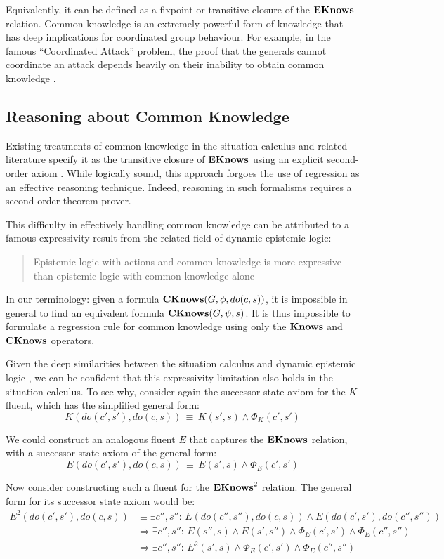 Equivalently, it can be defined as a fixpoint or transitive closure
of the $\mathbf{EKnows}$ relation. Common knowledge is an extremely powerful
form of knowledge that has deep implications for coordinated group
behaviour. For example, in the famous {}``Coordinated Attack'' problem,
the proof that the generals cannot coordinate an attack depends heavily
on their inability to obtain common knowledge \citep{halpern90knowledge_distrib}.


\subsection{Reasoning about Common Knowledge}

Existing treatments of common knowledge in the situation calculus
and related literature specify it as the transitive closure of $\mathbf{EKnows}$
using an explicit second-order axiom \citep{davis05fo_ma_theory,ghaderi07sc_joint_ability}.
While logically sound, this approach forgoes the use of regression
as an effective reasoning technique. Indeed, reasoning in such formalisms
requires a second-order theorem prover.

This difficulty in effectively handling common knowledge can be attributed
to a famous expressivity result from the related field of dynamic
epistemic logic:

\begin{quote}
Epistemic logic with actions and common knowledge is more expressive
than epistemic logic with common knowledge alone \citep{baltag98pa_ck}
\end{quote}
In our terminology: given a formula $\mathbf{CKnows}(G,\phi,do(c,s))$, it
is impossible in general to find an equivalent formula $\mathbf{CKnows}(G,\psi,s)$.
It is thus impossible to formulate a regression rule for common knowledge
using only the $\mathbf{Knows}$ and $\mathbf{CKnows}$ operators.

Given the deep similarities between the situation calculus and dynamic
epistemic logic \citep{vanbentham07ml_sitcalc}, we can be confident
that this expressivity limitation also holds in the situation calculus.
To see why, consider again the successor state axiom for the $K$
fluent, which has the simplified general form:\[
K(do(c',s'),do(c,s))\,\equiv\, K(s',s)\wedge\Phi_{K}(c',s')\]


We could construct an analogous fluent $E$ that captures the $\mathbf{EKnows}$
relation, with a successor state axiom of the general form:\[
E(do(c',s'),do(c,s))\,\equiv\, E(s',s)\wedge\Phi_{E}(c',s')\]


Now consider constructing such a fluent for the $\mathbf{EKnows}^{2}$ relation.
The general form for its successor state axiom would be:\begin{align*}
E^{2}(do(c',s'),do(c,s)) & \equiv\exists c'',s'':\, E(do(c'',s''),do(c,s))\wedge E(do(c',s'),do(c'',s''))\\
 & \Rightarrow\exists c'',s'':\, E(s'',s)\wedge E(s',s'')\wedge\Phi_{E}(c',s')\wedge\Phi_{E}(c'',s'')\\
 & \Rightarrow\exists c'',s'':\, E^{2}(s',s)\wedge\Phi_{E}(c',s')\wedge\Phi_{E}(c'',s'')\end{align*}


